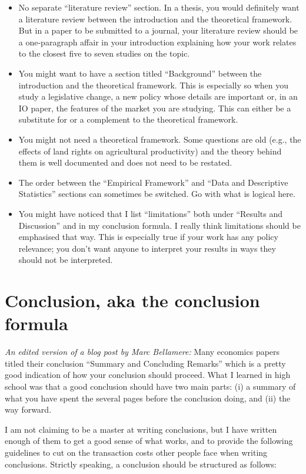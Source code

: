 \begin{itemize}
\item No separate ``literature review'' section. In a thesis, you would definitely want a literature review between the introduction and the theoretical framework. But in a paper to be submitted to a journal, your literature review should be a one-paragraph affair in your introduction explaining how your work relates to the closest five to seven studies on the topic.
\item You might want to have a section titled ``Background'' between the introduction and the theoretical framework. This is especially so when you study a legislative change, a new policy whose details are important or, in an IO paper, the features of the market you are studying. This can either be a substitute for or a complement to the theoretical framework.
\item You might not need a theoretical framework. Some questions are old (e.g., the effects of land rights on agricultural productivity) and the theory behind them is well documented and does not need to be restated.
\item The order between the ``Empirical Framework'' and ``Data and Descriptive Statistics'' sections can sometimes be switched. Go with what is logical here.
\item You might have noticed that I list ``limitations'' both under ``Results and Discussion'' and in my conclusion formula. I really think limitations should be emphasised that way. This is especially true if your work has any policy relevance; you don’t want anyone to interpret your results in ways they should not be interpreted.
\end{itemize}

\section{Conclusion, aka the conclusion formula}
\textit{An edited version of a blog post by Marc Bellamere:}
Many economics papers titled their conclusion ``Summary and Concluding Remarks'' which is a pretty good indication of how your conclusion should proceed. What I learned in high school was that a good conclusion should have two main parts: (i) a summary of what you have spent the several pages before the conclusion doing, and (ii) the way forward.

I am not claiming to be a master at writing conclusions, but I have written enough of them to get a good sense of what works, and to provide the following guidelines to cut on the transaction costs other people face when writing conclusions. Strictly speaking, a conclusion should be structured as follows:

